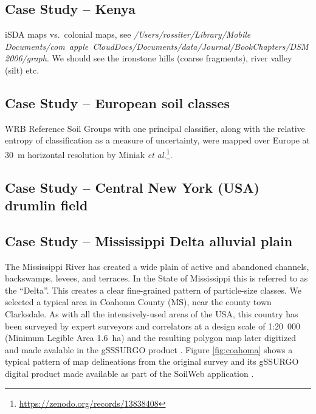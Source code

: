 \documentclass[soil, manuscript]{copernicus}
\begin{document}
\subsection{Case Study -- Kenya}

iSDA maps vs.\ colonial maps, see \emph{/Users/rossiter/Library/Mobile Documents/com~apple~CloudDocs/Documents/data/Journal/BookChapters/DSM2006/graph}. We should see the ironstone hills (coarse fragments), river valley (silt) etc.

\subsection{Case Study -- European soil classes}

WRB Reference Soil Groups with one principal classifier, along with the relative entropy of classification as a measure of uncertainty, were mapped over Europe at 30~m horizontal resolution by  Miniak \emph{et al.}\footnote{\url{https://zenodo.org/records/13838408}}.


\subsection{Case Study -- Central New York (USA) drumlin field}

\citep{naumanSoilLandscapesUnited2024}

\subsection{Case Study -- Mississippi Delta alluvial plain}

\par
The Mississippi River has created a wide plain of active and abandoned channels, backswamps, levees, and terraces.
%
In the State of Mississippi this is referred to as the ``Delta''.
%
This creates a clear fine-grained pattern of particle-size classes.
%
We selected a typical area in Coahoma County (MS), near the county town Clarksdale.
%
As with all the intensively-used areas of the USA, this country has been surveyed by expert surveyors and correlators  \citep{unitedstates.naturalresourcesconservationserviceSoilSurveyCoahoma1959} at a design scale of 1:20~000 (Minimum Legible Area 1.6~ha) and the resulting polygon map later digitized and made avalable in the gSSSURGO product \citep{nrcssoilsDescriptionGriddedSoil2022}.
%
Figure \ref{fig:coahoma} shows a typical pattern of map delineations from the original survey and its gSSURGO digital product made available as part of the SoilWeb application \citep{californiasoilresourcelabSoilWebApps, OGeenSoilWebMultifacetedInterface2017}.
\end{document}
